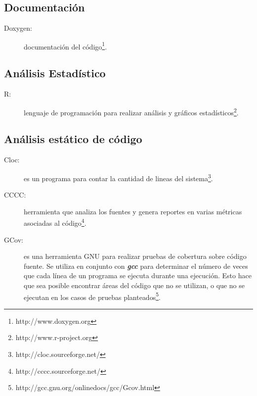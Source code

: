 \subsection{Documentación}
\begin{description}
    \item[Doxygen:] documentación del código\footnote{http://www.doxygen.org}.
\end{description}

\subsection{Análisis Estadístico}
\begin{description}
    \item[R:] lenguaje de programación para realizar análisis y gráficos estadísticos\footnote{http://www.r-project.org}.
\end{description}


\subsection{Análisis estático de código}
\begin{description}
    \item [Cloc:] es un programa para contar la cantidad de lineas del sistema\footnote{http://cloc.sourceforge.net/}.
    \item [CCCC:] herramienta que analiza los fuentes \cpp{} y genera reportes en varias métricas asociadas al
                  código\footnote{http://cccc.sourceforge.net/}.
    \item [GCov:] es una herramienta GNU para realizar pruebas de cobertura sobre código fuente. Se utiliza en conjunto con
                  \textbf{\textit{gcc}} para determinar el número de veces que cada línea de un programa se ejecuta durante una ejecución.
                  Esto hace que sea posible encontrar áreas del código que no se utilizan, o que no se ejecutan en los casos de pruebas
                  planteados\footnote{http://gcc.gnu.org/onlinedocs/gcc/Gcov.html}.
\end{description}

